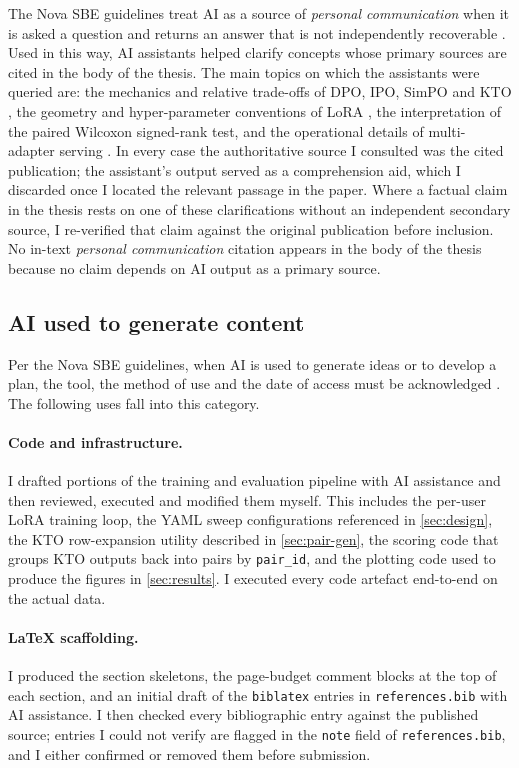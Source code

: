The Nova SBE guidelines treat AI as a source of \emph{personal communication}
when it is asked a question and returns an answer that is not independently
recoverable \citep{novasbe-genai}. Used in this way, AI assistants helped
clarify concepts whose primary sources are cited in the body of the thesis.
The main topics on which the assistants were queried are: the mechanics and
relative trade-offs of DPO, IPO, SimPO and KTO
\citep{rafailov2023dpo,azar2024ipo,meng2024simpo,ethayarajh2024kto}, the
geometry and hyper-parameter conventions of LoRA \citep{hu2021lora},
the interpretation of the paired Wilcoxon signed-rank test, and the operational
details of multi-adapter serving \citep{sheng2024slora}. In every case the
authoritative source I consulted was the cited publication; the assistant's
output served as a comprehension aid, which I discarded once I located the
relevant passage in the paper. Where a factual claim in the thesis rests on
one of these clarifications without an independent secondary source, I
re-verified that claim against the original publication before inclusion. No
in-text \emph{personal communication} citation appears in the body of the
thesis because no claim depends on AI output as a primary source.

\subsection*{AI used to generate content}

Per the Nova SBE guidelines, when AI is used to generate ideas or to develop a
plan, the tool, the method of use and the date of access must be acknowledged
\citep{novasbe-genai}. The following uses fall into this category.

\paragraph{Code and infrastructure.}
I drafted portions of the training and evaluation pipeline with AI
assistance and then reviewed, executed and modified them myself. This
includes the per-user LoRA training loop, the YAML sweep configurations
referenced in \cref{sec:design}, the KTO row-expansion utility described in
\cref{sec:pair-gen}, the scoring code that groups KTO outputs back into pairs
by \texttt{pair\_id}, and the plotting code used to produce the figures in
\cref{sec:results}. I executed every code artefact end-to-end on the actual
data.

\paragraph{LaTeX scaffolding.}
I produced the section skeletons, the page-budget comment blocks at the top
of each section, and an initial draft of the \texttt{biblatex} entries in
\texttt{references.bib} with AI assistance. I then checked every bibliographic
entry against the published source; entries I could not verify are flagged in
the \texttt{note} field of \texttt{references.bib}, and I either confirmed or
removed them before submission.

